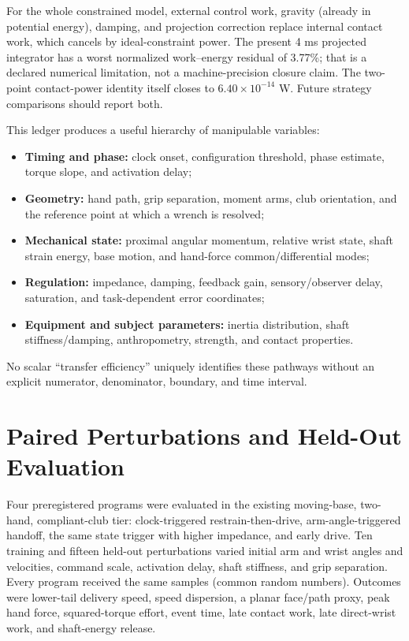 \documentclass[
  letterpaper,
]{report}
\providecommand{\tightlist}{%
  \setlength{\itemsep}{0pt}\setlength{\parskip}{0pt}}
\begin{document}
For the whole constrained model, external control work, gravity (already
in potential energy), damping, and projection correction replace
internal contact work, which cancels by ideal-constraint power. The
present 4 ms projected integrator has a worst normalized work--energy
residual of 3.77\%; that is a declared numerical limitation, not a
machine-precision closure claim. The two-point contact-power identity
itself closes to \(6.40\times10^{-14}\) W. Future strategy comparisons
should report both.

This ledger produces a useful hierarchy of manipulable variables:

\begin{itemize}
\tightlist
\item
  \textbf{Timing and phase:} clock onset, configuration threshold, phase
  estimate, torque slope, and activation delay;
\item
  \textbf{Geometry:} hand path, grip separation, moment arms, club
  orientation, and the reference point at which a wrench is resolved;
\item
  \textbf{Mechanical state:} proximal angular momentum, relative wrist
  state, shaft strain energy, base motion, and hand-force
  common/differential modes;
\item
  \textbf{Regulation:} impedance, damping, feedback gain,
  sensory/observer delay, saturation, and task-dependent error
  coordinates;
\item
  \textbf{Equipment and subject parameters:} inertia distribution, shaft
  stiffness/damping, anthropometry, strength, and contact properties.
\end{itemize}

No scalar ``transfer efficiency'' uniquely identifies these pathways
without an explicit numerator, denominator, boundary, and time interval.

\section{Paired Perturbations and Held-Out
Evaluation}\label{paired-perturbations-and-held-out-evaluation}

Four preregistered programs were evaluated in the existing moving-base,
two-hand, compliant-club tier: clock-triggered restrain-then-drive,
arm-angle-triggered handoff, the same state trigger with higher
impedance, and early drive. Ten training and fifteen held-out
perturbations varied initial arm and wrist angles and velocities,
command scale, activation delay, shaft stiffness, and grip separation.
Every program received the same samples (common random numbers).
Outcomes were lower-tail delivery speed, speed dispersion, a planar
face/path proxy, peak hand force, squared-torque effort, event time,
late contact work, late direct-wrist work, and shaft-energy release.
\end{document}
